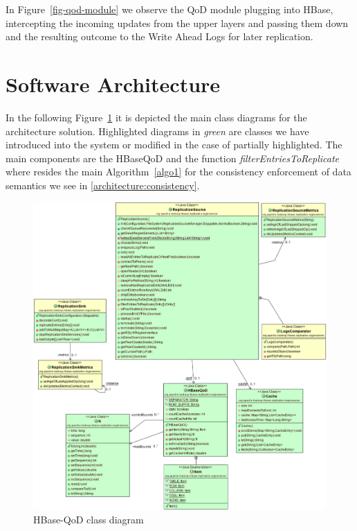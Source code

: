 In Figure~\ref{fig-qod-module} we observe the QoD module plugging into HBase, intercepting the incoming updates from the upper layers and passing them down and the resulting outcome to the Write Ahead Logs for later replication.

\section{Software Architecture}
In the following Figure~\ref{fig-class-diagram} it is depicted the main class diagrams for the architecture solution. Highlighted diagrams in \emph{green} are classes we have introduced into the system or modified in the case of partially highlighted. The main components are the HBaseQoD and the function \emph{filterEntriesToReplicate} where resides the main Algorithm~\ref{algo1} for the consistency enforcement of data semantics we see in \ref{architecture:consistency}.

\begin{figure}
\centering
\includegraphics[width=1.0\linewidth]{figs/HBaseQoD-class-diagram.pdf}
\caption{HBase-QoD class diagram}
\label{fig-class-diagram}
\end{figure}

